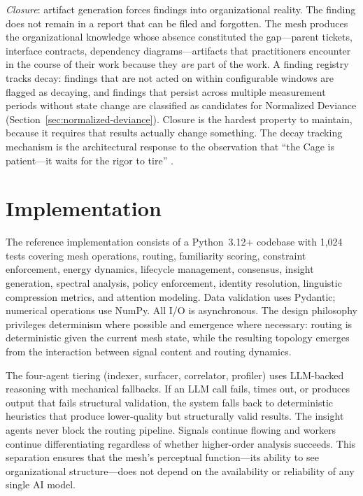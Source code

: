 \documentclass[11pt,a4paper]{article}
\begin{document}
\emph{Closure}: artifact generation forces findings into organizational reality. The finding does not remain in a report that can be filed and forgotten. The mesh produces the organizational knowledge whose absence constituted the gap---parent tickets, interface contracts, dependency diagrams---artifacts that practitioners encounter in the course of their work because they \emph{are} part of the work. A finding registry tracks decay: findings that are not acted on within configurable windows are flagged as decaying, and findings that persist across multiple measurement periods without state change are classified as candidates for Normalized Deviance (Section~\ref{sec:normalized-deviance}). Closure is the hardest property to maintain, because it requires that results actually change something. The decay tracking mechanism is the architectural response to the observation that ``the Cage is patient---it waits for the rigor to tire'' \citep{mcentire2026}.


\section{Implementation}
\label{sec:implementation}

The reference implementation consists of a Python~3.12+ codebase with 1,024 tests covering mesh operations, routing, familiarity scoring, constraint enforcement, energy dynamics, lifecycle management, consensus, insight generation, spectral analysis, policy enforcement, identity resolution, linguistic compression metrics, and attention modeling. Data validation uses Pydantic; numerical operations use NumPy. All I/O is asynchronous. The design philosophy privileges determinism where possible and emergence where necessary: routing is deterministic given the current mesh state, while the resulting topology emerges from the interaction between signal content and routing dynamics.

The four-agent tiering (indexer, surfacer, correlator, profiler) uses LLM-backed reasoning with mechanical fallbacks. If an LLM call fails, times out, or produces output that fails structural validation, the system falls back to deterministic heuristics that produce lower-quality but structurally valid results. The insight agents never block the routing pipeline. Signals continue flowing and workers continue differentiating regardless of whether higher-order analysis succeeds. This separation ensures that the mesh's perceptual function---its ability to see organizational structure---does not depend on the availability or reliability of any single AI model.
\end{document}
